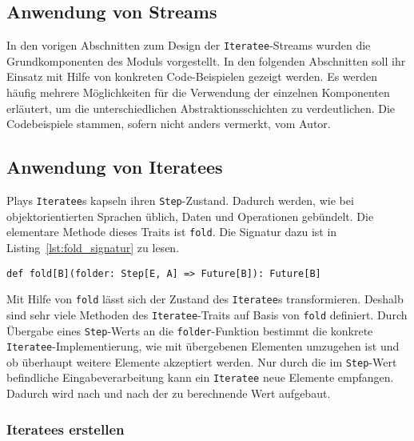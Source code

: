 

\subsection{Anwendung von Streams} %
\label{sub:anwendung}

In den vorigen Abschnitten zum Design der \lstinline|Iteratee|-Streams wurden die Grundkomponenten des Moduls vorgestellt.
In den folgenden Abschnitten soll ihr Einsatz mit Hilfe von konkreten Code-Beispielen gezeigt werden.
Es werden häufig mehrere Möglichkeiten für die Verwendung der einzelnen Komponenten erläutert, um die unterschiedlichen Abstraktionsschichten zu verdeutlichen.
Die Codebeispiele stammen, sofern nicht anders vermerkt, vom Autor.



\subsection{Anwendung von Iteratees} %
\label{sub:iteratees}

Plays \lstinline|Iteratee|s kapseln ihren \lstinline|Step|-Zustand.
Dadurch werden, wie bei objektorientierten Sprachen üblich, Daten und Operationen gebündelt.
Die elementare Methode dieses Traits ist \lstinline|fold|.
Die Signatur dazu ist in Listing~\ref{lst:fold_signatur} zu lesen.
\begin{lstlisting}[caption=Die Signatur von fold, label=lst:fold_signatur]
def fold[B](folder: Step[E, A] => Future[B]): Future[B]
\end{lstlisting}

Mit Hilfe von \lstinline|fold| lässt sich der Zustand des \lstinline|Iteratee|s transformieren.
Deshalb sind sehr viele Methoden des \lstinline|Iteratee|-Traits auf Basis von \lstinline|fold| definiert.
Durch Übergabe eines \lstinline|Step|-Werts an die \lstinline|folder|-Funktion bestimmt die konkrete \lstinline|Iteratee|-Implementierung, wie mit übergebenen Elementen umzugehen ist und ob überhaupt weitere Elemente akzeptiert werden.
Nur durch die im \lstinline|Step|-Wert befindliche Eingabeverarbeitung kann ein \lstinline|Iteratee| neue Elemente empfangen.
Dadurch wird nach und nach der zu berechnende Wert aufgebaut.

\subsubsection{Iteratees erstellen} %
\label{ssub:iteratees_erstellen}

